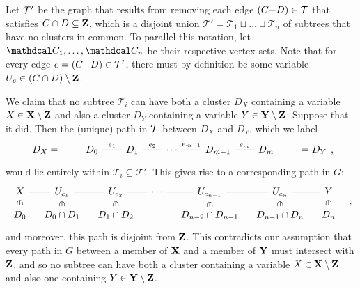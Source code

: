 \begin{subappendices}
\begin{lproof}
    Let $\cal T'$ be the graph that results from removing each edge $(C{-}D) \in \cal T$ that satisfies $C \cap D \subseteq \mathbf Z$, which is a disjoint union  $\mathcal T' = \mathcal T_1 \sqcup \ldots \sqcup \mathcal T_n$ of subtrees that have no clusters in common.
    To parallel this notation, let $\C_1, \ldots, \C_n$ be their respective vertex sets.
    Note that for every edge $e=(C{-}D)\in \cal T'$, there must by definition be some variable $U_e \in (C \cap D) \setminus \mathbf Z$.

    We claim that no subtree $\mathcal T_i$ can have both a cluster $D_X$ containing a variable $X \in \mathbf X \setminus \mathbf Z$ and also a cluster $D_Y$ containing a variable $Y \in \mathbf Y \setminus \mathbf Z$.
    Suppose that it did.
    Then the (unique) path in $\cal T$ between $D_X$ and $D_Y$, which we label
    \[
    \begin{tikzcd}[column sep=2em]
        D_X=
        &D_0 \ar[r,-,"e_1"]&
        D_1 \ar[r,-,"e_2"]&
          \cdots
        \ar[r,-,"e_{m-1}"]& D_{m-1}
        \ar[r,-,"e_m"] & D_m&
        =D_Y
    \end{tikzcd},
    \]
    would lie entirely within $\mathcal T_i \subseteq \mathcal T'$. This gives rise to
    a corresponding path in $G$:
    \[\begin{tikzcd}[column sep=1em,row sep=1.5ex]
        X \ar[r,-] \ar[d,sloped,phantom,"\in"]
        & U_{e_1}\ar[r,-] \ar[d,sloped,phantom,"\in"]
        & U_{e_2}\ar[r,-] \ar[d,sloped,phantom,"\in"]
           &\cdots\ar[r,-]
        & U_{e_{n{-}1}} \ar[r,-] \ar[d,sloped,phantom,"\in"]
        & U_{e_n}\ar[r,-] \ar[d,sloped,phantom,"\in"]
        & Y \ar[d,sloped,phantom,"\in"]
            \\
        D_0
        & D_0 \cap D_1
        & D_1 \cap D_2
        &
        & D_{n{-}2} \cap D_{n{-}1}
        & D_{n{-}1} \cap D_n
        & D_n
    \end{tikzcd}\quad,\]
    and moreover, this path is disjoint from $\mathbf Z$.
    This contradicts our assumption that every path in $G$ between a member of $\mathbf X$ and a member of $\mathbf Y$ must intersect with $\mathbf Z$, and so no subtree can have both a cluster containing a variable $X \in \mathbf X \setminus \mathbf Z$ and also one containing $Y \in \mathbf Y \setminus \mathbf Z$.


\end{lproof}
\end{subappendices}
